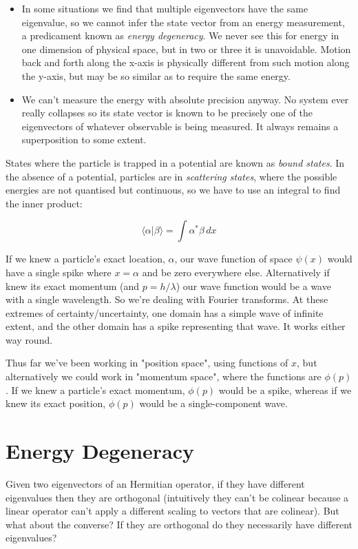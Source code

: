 \begin{itemize}
  \item In some situations we find that multiple eigenvectors have the same eigenvalue, so we cannot infer the state vector from an energy measurement, a predicament known as \textit{energy degeneracy}. We never see this for energy in one dimension of physical space, but in two or three it is unavoidable. Motion back and forth along the x-axis is physically different from such motion along the y-axis, but may be so similar as to require the same energy.
  \item We can't measure the energy with absolute precision anyway. No system ever really collapses so its state vector is known to be precisely one of the eigenvectors of whatever observable is being measured. It always remains a superposition to some extent.
\end{itemize}

States where the particle is trapped in a potential are known as \textit{bound states}. In the absence of a potential, particles are in \textit{scattering states}, where the possible energies are not quantised but continuous, so we have to use an integral to find the inner product:

$$
\langle \alpha | \beta \rangle
=
\int
\alpha^* \beta \,dx
$$

If we knew a particle's exact location, $\alpha$, our wave function of space $\psi(x)$ would have a single spike where $x = \alpha$ and be zero everywhere else. Alternatively if knew its exact momentum (and $p=h/\lambda$) our wave function would be a wave with a single wavelength. So we're dealing with Fourier transforms. At these extremes of certainty/uncertainty, one domain has a simple wave of infinite extent, and the other domain has a spike representing that wave. It works either way round.

Thus far we've been working in "position space", using functions of $x$, but alternatively we could work in "momentum space", where the functions are $\phi(p)$. If we knew a particle's exact momentum, $\phi(p)$ would be a spike, whereas if we knew its exact position, $\phi(p)$ would be a single-component wave.

\section{Energy Degeneracy}

Given two eigenvectors of an Hermitian operator, if they have different eigenvalues then they are orthogonal (intuitively they can't be colinear because a linear operator can't apply a different scaling to vectors that are colinear). But what about the converse? If they are orthogonal do they necessarily have different eigenvalues?

